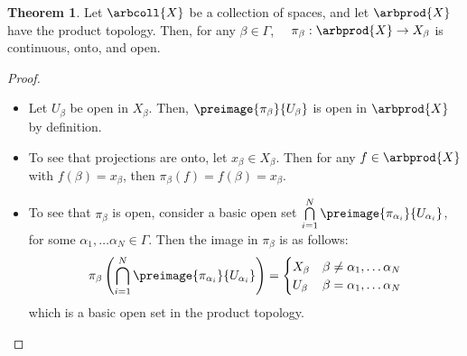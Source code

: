 \documentclass[a5paper]{article}
\theoremstyle{definition}%
\newtheorem{theorem}{Theorem}
\numberwithin{exercise}{section}
\theoremstyle{remark}%
\begin{document}
\begin{highlight}
\begin{theorem}
Let $\arbcoll{X}$ be a collection of spaces, and let $\arbprod{X}$ have the product topology. Then, for any $\beta\in\Gamma$, $\quad \pi_\beta :\arbprod{X} \to X_\beta$ is continuous, onto, and open. 
\end{theorem}
\end{highlight}
\begin{proof}\mbox{}
\begin{itemize}
\item Let $U_\beta$ be open in $X_\beta$. Then, $\preimage{\pi_\beta}{U_\beta}$ is open in $\arbprod{X}$ by definition. 
\item To see that projections are onto, let $x_\beta\in X_\beta$. Then for any $f\in\arbprod{X}$ with $f(\beta)=x_\beta$, then $\pi_\beta(f)=f(\beta)=x_\beta$. 
\item To see that $\pi_\beta$ is open, consider a basic open set $\bigcap\limits_{i=1}^N \preimage{\pi_{\alpha_i}}{U_{\alpha_i}}$, for some $\alpha_1, \ldots \alpha_N \in \Gamma$. Then the image in $\pi_\beta$ is as follows: 
\[\pi_\beta\left(\bigcap\limits_{i=1}^N \preimage{\pi_{\alpha_i}}{U_{\alpha_i}}\right)=
\begin{cases}
X_\beta & \beta\neq\alpha_1, \ldots \alpha_N\\
U_\beta & \beta=\alpha_1, \ldots \alpha_N\\
\end{cases}\]
which is a basic open set in the product topology. 
\end{itemize}
\end{proof}
\end{document}
